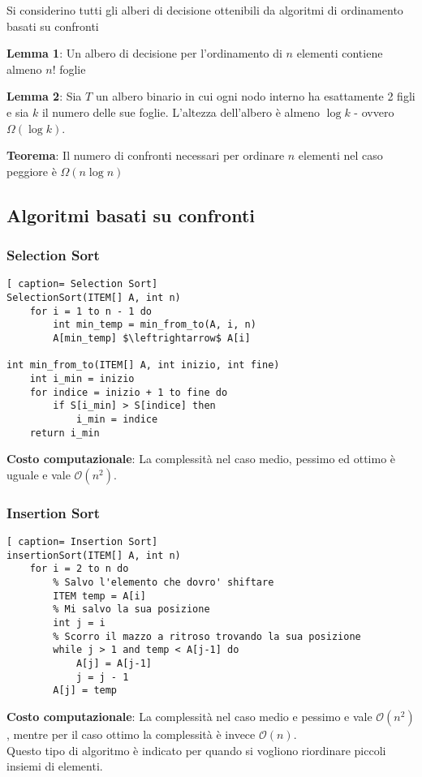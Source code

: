 \documentclass[../cheatSheetAlgoritmi.tex]{subfiles}
\begin{document}
Si considerino tutti gli alberi di decisione ottenibili da algoritmi di ordinamento basati su confronti

\bigskip
\textbf{Lemma 1}: Un albero di decisione per l'ordinamento di $n$ elementi contiene almeno $n!$ foglie

\bigskip
\textbf{Lemma 2}: Sia $T$ un albero binario in cui ogni nodo interno ha esattamente 2 figli e sia $k$ il numero delle sue foglie. L'altezza dell'albero è almeno $\log k$ - ovvero $\Omega(\log k)$.

\bigskip
\textbf{Teorema}: Il numero di confronti necessari per ordinare $n$ elementi nel caso
peggiore è $\Omega(n \log n)$
\newpage
\subsection{Algoritmi basati su confronti}
\subsubsection{Selection Sort}
\begin{lstlisting}[ caption= Selection Sort]
SelectionSort(ITEM[] A, int n)
	for i = 1 to n - 1 do
		int min_temp = min_from_to(A, i, n)
		A[min_temp] $\leftrightarrow$ A[i]

int min_from_to(ITEM[] A, int inizio, int fine)
	int i_min = inizio
  	for indice = inizio + 1 to fine do
		if S[i_min] > S[indice] then
			i_min = indice
	return i_min
\end{lstlisting}
\textbf{Costo computazionale}: La complessità nel caso medio, pessimo ed ottimo è uguale e vale $\mathcal{O}(n^{2})$.
\subsubsection{Insertion Sort}
\begin{lstlisting}[ caption= Insertion Sort]
insertionSort(ITEM[] A, int n)
	for i = 2 to n do
		% Salvo l'elemento che dovro' shiftare
		ITEM temp = A[i]
		% Mi salvo la sua posizione
		int j = i
		% Scorro il mazzo a ritroso trovando la sua posizione
		while j > 1 and temp < A[j-1] do
			A[j] = A[j-1]
			j = j - 1
		A[j] = temp
\end{lstlisting}
\textbf{Costo computazionale}: La complessità nel caso medio e pessimo  e vale $\mathcal{O}(n^{2})$, mentre per il caso ottimo la complessità è invece $\mathcal{O}(n)$. \\
Questo tipo di algoritmo è indicato per quando si vogliono riordinare piccoli insiemi di elementi.
\newpage
\end{document}
